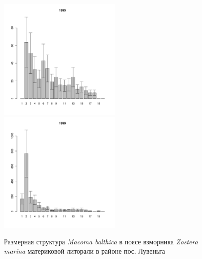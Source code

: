 \documentclass[12pt, a4paper]{article}
\begin{document}
\begin{figure}[h]
\begin{multicols}{3}
\hfill
\includegraphics[width=60mm]{../White_Sea/Luvenga_II_razrez/zostera_zone_1995_.pdf}
\hfill
\includegraphics[width=60mm]{../White_Sea/Luvenga_II_razrez/zostera_zone_1999_.pdf}

\end{multicols}


\caption{Размерная структура {\it Macoma balthica} в поясе взморника {\it Zostera marina} материковой литорали в районе пос. Лувеньга}
\label{ris:size_str_2razrez_zostera}
\end{figure}
\end{document}
